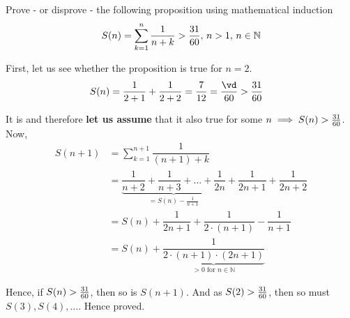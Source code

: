 

\DIVIDE{}\vc
{}\vc\vd

\question[4] Prove - or disprove - the following proposition using mathematical induction 
\[ S(n) = \sum_{k=1}^n\dfrac{1}{n + k} > \dfrac{31}{60},\,n > 1,\, n\in\mathbb{N} \]

\watchout
\insertQR{}

\begin{solution}[\halfpage]
  First, let us see whether the proposition is true for $n=2$.
  \begin{align}
    S(n) &= \dfrac{1}{2+1} + \dfrac{1}{2+2} = \dfrac{7}{12} = \dfrac\vd\vb > \dfrac\va\vb
  \end{align}

  It is and therefore \textbf{let us assume} that it also true for some $n\implies S(n) > \frac{31}{60}$. 
  Now, 
  \begin{align}
    S(n+1) &= \sum_{k=1}^{n+1}\dfrac{1}{(n+1) + k} \\ 
           &= \underbrace{\dfrac{1}{n+2} + \dfrac{1}{n+3} + \ldots + \dfrac{1}{2n}}_{= S(n) - \frac{1}{n+1}} 
           + \dfrac{1}{2n+1} + \dfrac{1}{2n + 2 } \\
           &= S(n) + \dfrac{1}{2n+1} + \dfrac{1}{2\cdot (n+1)} - \dfrac{1}{n+1} \\
           &= S(n) + \underbrace{\dfrac{1}{2\cdot(n+1)\cdot(2n+1)}}_{ > 0\text{ for } n\in\mathbb{N}}
  \end{align}

  Hence, if $S(n) > \frac{31}{60}$, then so is $S(n+1)$. And as $S(2) > \frac{31}{60}$, then so 
  must $S(3), S(4),\ldots$. Hence proved.
\end{solution}

